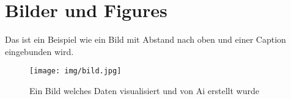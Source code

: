 \section{Bilder und Figures}
Das ist ein Beispiel wie ein Bild mit Abstand nach oben und einer Caption eingebunden wird.

\vspace{1cm}
\begin{figure}[H]
  \centering
  \texttt{[image: img/bild.jpg]}
  \caption{Ein Bild welches Daten visualisiert und von Ai erstellt wurde}
\end{figure}
